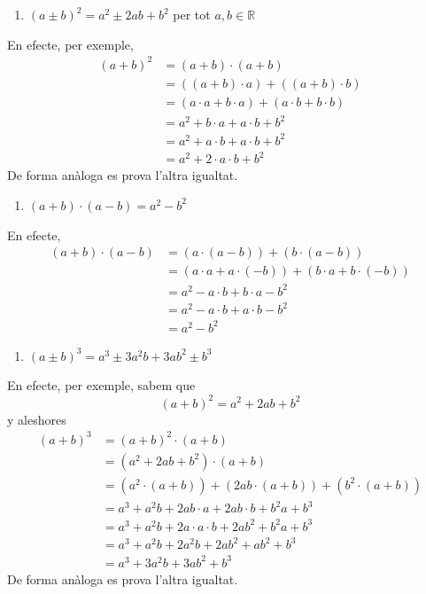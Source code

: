 \begin{enumerate}
\item[17.] $(a\pm b)^{2}=a^{2}\pm 2ab+b^{2}$ per tot $a,b\in \mathbb{R}$
\end{enumerate}

En efecte, per exemple,%
\begin{align*}
(a+b)^{2} &=(a+b)\cdot (a+b) \\
&=\left( (a+b)\cdot a\right) +\left( (a+b)\cdot b\right) \\
&=\left( a\cdot a+b\cdot a\right) +\left( a\cdot b+b\cdot b\right) \\
&=a^{2}+b\cdot a+a\cdot b+b^{2} \\
&=a^{2}+a\cdot b+a\cdot b+b^{2} \\
&=a^{2}+2\cdot a\cdot b+b^{2}
\end{align*}%
De forma anàloga es prova l’altra igualtat.

\begin{enumerate}
\item[18.] $(a+b)\cdot (a-b)=a^{2}-b^{2}$
\end{enumerate}

En efecte,%
\begin{align*}
(a+b)\cdot (a-b) &=\left( a\cdot (a-b)\right) +\left( b\cdot (a-b)\right) \\
&=\left( a\cdot a+a\cdot (-b)\right) +\left( b\cdot a+b\cdot (-b)\right) \\
&=a^{2}-a\cdot b+b\cdot a-b^{2} \\
&=a^{2}-a\cdot b+a\cdot b-b^{2} \\
&=a^{2}-b^{2}
\end{align*}

\begin{enumerate}
\item[19.] $(a\pm b)^{3}=a^{3}\pm 3a^{2}b+3ab^{2}\pm b^{3}$
\end{enumerate}

En efecte, per exemple, sabem que%
\begin{equation*}
(a+b)^{2}=a^{2}+2ab+b^{2}
\end{equation*}%
y aleshores%
\begin{align*}
(a+b)^{3} &=(a+b)^{2}\cdot (a+b) \\
&=\left( a^{2}+2ab+b^{2}\right) \cdot (a+b) \\
&=\left( a^{2}\cdot (a+b)\right) +\left( 2ab\cdot (a+b)\right) +\left(
b^{2}\cdot (a+b)\right) \\
&=a^{3}+a^{2}b+2ab\cdot a+2ab\cdot b+b^{2}a+b^{3} \\
&=a^{3}+a^{2}b+2a\cdot a\cdot b+2ab^{2}+b^{2}a+b^{3} \\
&=a^{3}+a^{2}b+2a^{2}b+2ab^{2}+ab^{2}+b^{3} \\
&=a^{3}+3a^{2}b+3ab^{2}+b^{3}
\end{align*}%
De forma anàloga es prova l’altra igualtat.

